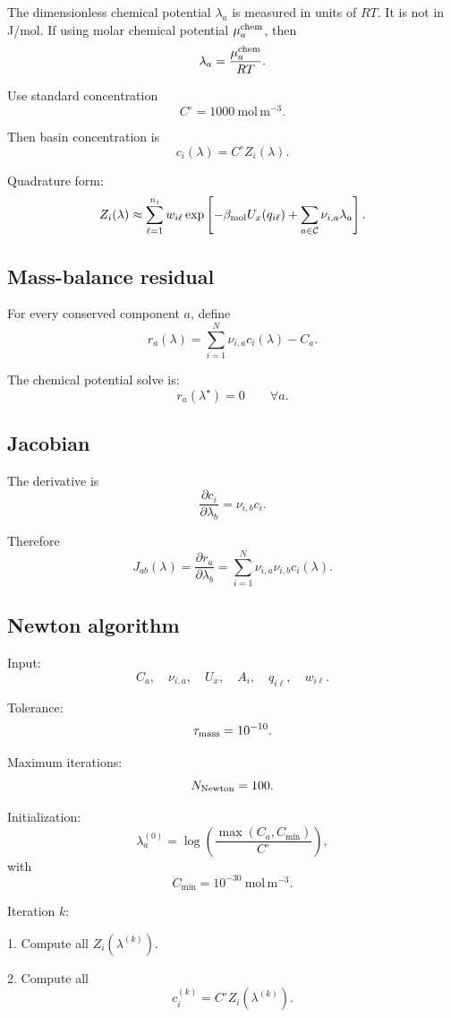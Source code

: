 \documentclass[11pt]{article}
\begin{document}
The dimensionless chemical potential \(\lambda_a\) is measured in units of
\(RT\). It is not in J/mol. If using molar chemical potential
\(\mu_a^{\rm chem}\), then
\[
\lambda_a=\frac{\mu_a^{\rm chem}}{RT}.
\]

Use standard concentration
\[
C^\circ=1000\ \mathrm{mol\,m^{-3}}.
\]

Then basin concentration is
\[
c_i(\lambda)=C^\circ Z_i(\lambda).
\]

Quadrature form:
\[
Z_i(\lambda)
\approx
\sum_{\ell=1}^{n_i}
w_{i\ell}
\exp
\left[
-\beta_{\rm mol}U_x(q_{i\ell})
+
\sum_{a\in\mathcal C}\nu_{i,a}\lambda_a
\right].
\]

\subsection{Mass-balance residual}

For every conserved component \(a\), define
\[
r_a(\lambda)
=
\sum_{i=1}^N\nu_{i,a}c_i(\lambda)-C_a.
\]

The chemical potential solve is:
\[
r_a(\lambda^\star)=0
\qquad
\forall a.
\]

\subsection{Jacobian}

The derivative is
\[
\frac{\partial c_i}{\partial\lambda_b}
=
\nu_{i,b}c_i.
\]

Therefore
\[
J_{ab}(\lambda)
=
\frac{\partial r_a}{\partial\lambda_b}
=
\sum_{i=1}^N\nu_{i,a}\nu_{i,b}c_i(\lambda).
\]

\subsection{Newton algorithm}

Input:
\[
C_a,\quad \nu_{i,a},\quad U_x,\quad A_i,\quad q_{i\ell},\quad w_{i\ell}.
\]

Tolerance:
\[
\tau_{\rm mass}=10^{-10}.
\]

Maximum iterations:
\[
N_{\rm Newton}=100.
\]

Initialization:
\[
\lambda_a^{(0)}
=
\log
\left(
\frac{\max(C_a,C_{\min})}{C^\circ}
\right),
\]
with
\[
C_{\min}=10^{-30}\ \mathrm{mol\,m^{-3}}.
\]

Iteration \(k\):

1. Compute all \(Z_i(\lambda^{(k)})\).

2. Compute all
\[
c_i^{(k)}=C^\circ Z_i(\lambda^{(k)}).
\]
\end{document}
